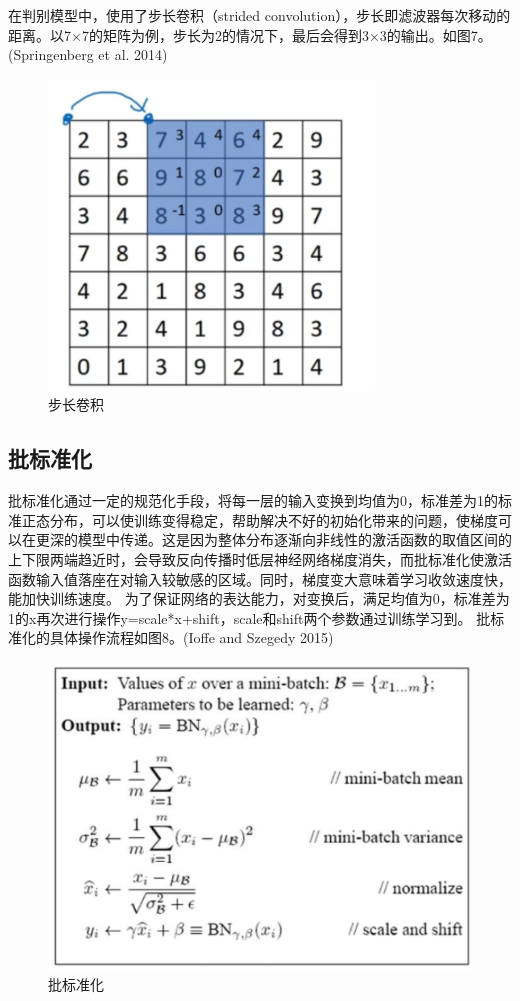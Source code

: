 \documentclass[
  hyperref, a4paper]{ctexart}
\begin{document}
在判别模型中，使用了步长卷积（strided
convolution），步长即滤波器每次移动的距离。以7×7的矩阵为例，步长为2的情况下，最后会得到3×3的输出。如图7。(Springenberg
et al. 2014)

\begin{figure}
\centering
\includegraphics{./7.png}
\caption{步长卷积}
\end{figure}

\hypertarget{ux6279ux6807ux51c6ux5316}{%
\subsection{批标准化}\label{ux6279ux6807ux51c6ux5316}}

批标准化通过一定的规范化手段，将每一层的输入变换到均值为0，标准差为1的标准正态分布，可以使训练变得稳定，帮助解决不好的初始化带来的问题，使梯度可以在更深的模型中传递。这是因为整体分布逐渐向非线性的激活函数的取值区间的上下限两端趋近时，会导致反向传播时低层神经网络梯度消失，而批标准化使激活函数输入值落座在对输入较敏感的区域。同时，梯度变大意味着学习收敛速度快，能加快训练速度。
为了保证网络的表达能力，对变换后，满足均值为0，标准差为1的x再次进行操作y=scale*x+shift，scale和shift两个参数通过训练学习到。
批标准化的具体操作流程如图8。(Ioffe and Szegedy 2015)

\begin{figure}
\centering
\includegraphics{./8.png}
\caption{批标准化}
\end{figure}
\end{document}
